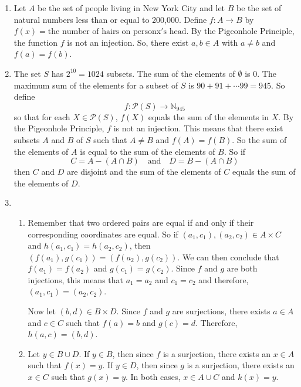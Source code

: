 \begin{enumerate}
\item Let $A$ be the set of people living in New York City and let $B$ be the set of natural numbers less than or equal to 200,000.  Define \linebreak
$f: A \to B$ by $f \left( x \right) = \text{the number of hairs on person} $x$'\text{s head}$.  By the Pigeonhole Principle, the function $f$ is not an injection.  So, there exist $a, b \in A$ with $a \ne b$ and 
$f \left( a \right) = f \left( b \right)$.

\item The set $S$ has $2^{10} = 1024$ subsets.  The sum of the elements of $\emptyset$ is 0.  The maximum sum of the elements for a subset of $S$ is $90 + 91 + \cdots 99 = 945$.  So define
\[
f: \mathcal{P} \left( S \right) \to \mathbb{N}_{945}
\]
so that for each $X \in \mathcal{P} \left( S \right)$, $f \left( X \right) $ equals the sum of the elements in $X$.  By the Pigeonhole Principle, $f$ is not an injection.  This means that there exist subsets $A$ and $B$ of $S$ such that $A \ne B$ and 
$f \left( A \right) = f \left( B \right)$.  So the sum of the elements of $A$ is equal to the sum of the elements of $B$.  So if
\[
C = A - \left( A \cap B \right) \quad \text{and} \quad D = B - \left( A \cap B \right)
\]
then $C$ and $D$ are disjoint and the sum of the elements of $C$ equals the sum of the elements of $D$.

\item \begin{enumerate}
\item Remember that two ordered pairs are equal if and only if their corresponding coordinates are equal.  So if $\left( a_1, c_1 \right) , \left( a_2, c_2 \right) \in A \times C$ and $h \left( a_1, c_1 \right) = h \left( a_2, c_2 \right)$, then 
$\left( f \left( a_1 \right), g \left( c_1 \right) \right) = 
\left( f \left( a_2 \right), g \left( c_2 \right) \right)$.  We can then conclude that 
$f \left( a_1 \right) = f \left( a_2 \right)$ and $g \left( c_1 \right) = g \left( c_2 \right)$.  Since $f$ and $g$ are both injections, this means that $a_1 = a_2$ and $c_1 = c_2$ and therefore, 
$\left( a_1, c_1 \right) = \left( a_2, c_2 \right)$.

Now let $\left( b, d \right) \in B \times D$.  Since $f$ and $g$ are surjections, there exists 
$a \in A$ and $c \in C$ such that $f \left( a \right) = b$ and $g \left( c \right) = d$.  Therefore, $h \left( a, c \right) = \left( b, d \right)$.

\item Let $y \in B \cup D$.  If $y \in B$, then since $f$ is a surjection, there exists an 
$x \in A$ such that $f \left( x \right) = y$.  If $y \in D$, then since $g$ is a surjection, there exists an $x \in C$ such that $g \left( x \right) = y$.  In both cases, $x \in A \cup C$ and 
$k \left( x \right) = y$.


\end{enumerate}
\end{enumerate}

